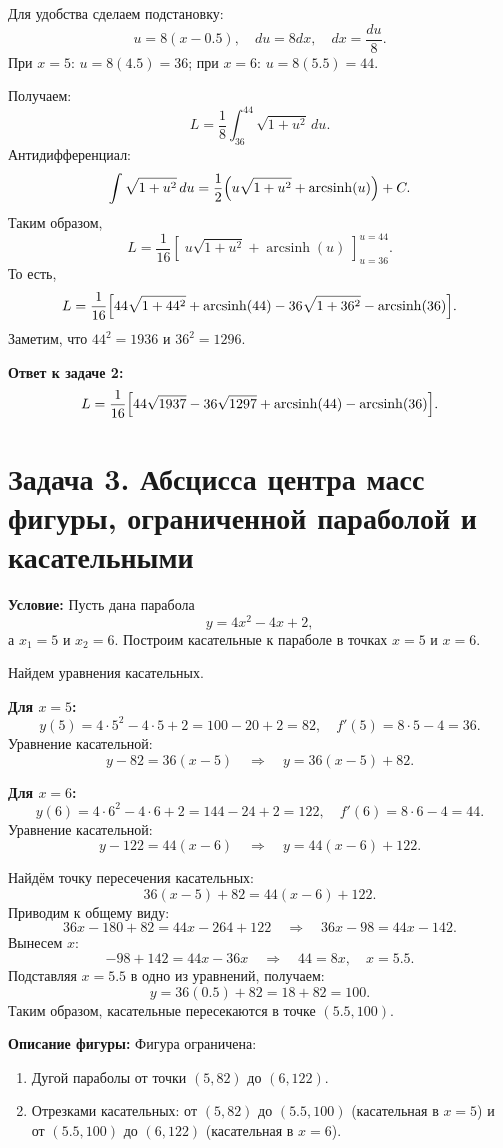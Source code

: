 \documentclass[12pt,a4paper]{article}
\begin{document}
Для удобства сделаем подстановку:
\[
u=8(x-0.5),\quad du=8dx,\quad dx=\frac{du}{8}.
\]
При \(x=5\): \(u=8(4.5)=36\); при \(x=6\): \(u=8(5.5)=44\).

Получаем:
\[
L=\frac{1}{8}\int_{36}^{44}\sqrt{1+u^2}\,du.
\]
Антидифференциал:
\[
\int \sqrt{1+u^2}\,du=\frac{1}{2}\Bigl(u\sqrt{1+u^2}+\operatorname{arcsinh}(u)\Bigr)+C.
\]
Таким образом,
\[
L=\frac{1}{16}\left[\;u\sqrt{1+u^2}+\operatorname{arcsinh}(u)\;\right]_{u=36}^{u=44}.
\]
То есть,
\[
L=\frac{1}{16}\Bigl[44\sqrt{1+44^2}+\operatorname{arcsinh}(44)-36\sqrt{1+36^2}-\operatorname{arcsinh}(36)\Bigr].
\]
Заметим, что \(44^2=1936\) и \(36^2=1296\).

\textbf{Ответ к задаче 2:}
\[
L=\frac{1}{16}\Bigl[44\sqrt{1937}-36\sqrt{1297}+\operatorname{arcsinh}(44)-\operatorname{arcsinh}(36)\Bigr].
\]

\section*{Задача 3. Абсцисса центра масс фигуры, ограниченной параболой и касательными}
\textbf{Условие:} Пусть дана парабола 
\[
y=4x^2-4x+2,
\]
а \(x_1=5\) и \(x_2=6\). Построим касательные к параболе в точках \(x=5\) и \(x=6\).

Найдем уравнения касательных.

\textbf{Для \(x=5\):}
\[
y(5)=4\cdot5^2-4\cdot5+2=100-20+2=82,\quad f'(5)=8\cdot5-4=36.
\]
Уравнение касательной:
\[
y-82=36(x-5)\quad\Rightarrow\quad y=36(x-5)+82.
\]

\textbf{Для \(x=6\):}
\[
y(6)=4\cdot6^2-4\cdot6+2=144-24+2=122,\quad f'(6)=8\cdot6-4=44.
\]
Уравнение касательной:
\[
y-122=44(x-6)\quad\Rightarrow\quad y=44(x-6)+122.
\]

Найдём точку пересечения касательных:
\[
36(x-5)+82=44(x-6)+122.
\]
Приводим к общему виду:
\[
36x-180+82=44x-264+122\quad\Longrightarrow\quad 36x-98=44x-142.
\]
Вынесем \(x\):
\[
-98+142=44x-36x\quad\Rightarrow\quad 44=8x,\quad x=5.5.
\]
Подставляя \(x=5.5\) в одно из уравнений, получаем:
\[
y=36(0.5)+82=18+82=100.
\]
Таким образом, касательные пересекаются в точке \((5.5,100)\).

\textbf{Описание фигуры:} Фигура ограничена:
\begin{enumerate}
  \item Дугой параболы от точки \((5,82)\) до \((6,122)\).
  \item Отрезками касательных: от \((5,82)\) до \((5.5,100)\) (касательная в \(x=5\)) и от \((5.5,100)\) до \((6,122)\) (касательная в \(x=6\)).
\end{enumerate}
\end{document}
